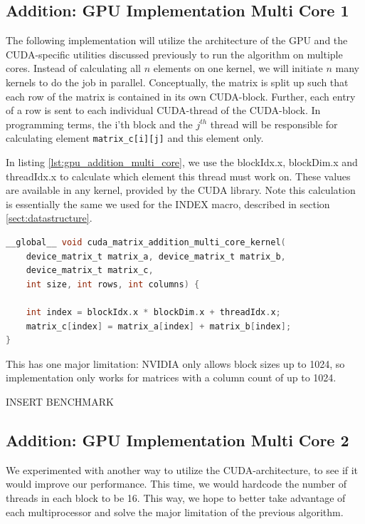 
\subsection{Addition: GPU Implementation Multi Core 1}
The following implementation will utilize the architecture of the GPU and the CUDA-specific utilities discussed previously to run the algorithm on multiple cores. Instead of calculating all $n$ elements on one kernel, we will initiate $n$ many kernels to do the job in parallel. Conceptually, the matrix is split up such that each row of the matrix is contained in its own CUDA-block. Further, each entry of a row is sent to each individual CUDA-thread of the CUDA-block. In programming terms, the i'th block and the $j^{th}$ thread will be responsible for calculating element \texttt{matrix\_c[i][j]} and this element only. 

In listing \ref{lst:gpu_addition_multi_core}, we use the blockIdx.x, blockDim.x and threadIdx.x to calculate which element this thread must work on. These values are available in any kernel, provided by the CUDA library. Note this calculation is essentially the same we used for the INDEX macro, described in section \ref{sect:datastructure}. 

\begin{lstlisting}[language=C, caption={GPU addition multi core}, label={lst:gpu_addition_multi_core}]
__global__ void cuda_matrix_addition_multi_core_kernel(
    device_matrix_t matrix_a, device_matrix_t matrix_b, 
    device_matrix_t matrix_c, 
    int size, int rows, int columns) {
    
    int index = blockIdx.x * blockDim.x + threadIdx.x;
    matrix_c[index] = matrix_a[index] + matrix_b[index];
}
\end{lstlisting}

This has one major limitation: NVIDIA only allows block sizes up to 1024, so implementation only works for matrices with a column count of up to 1024.

INSERT BENCHMARK

\subsection{Addition: GPU Implementation Multi Core 2}
We experimented with another way to utilize the CUDA-architecture, to see if it would improve our performance. This time, we would hardcode the number of threads in each block to be 16. This way, we hope to better take advantage of each multiprocessor and solve the major limitation of the previous algorithm.

